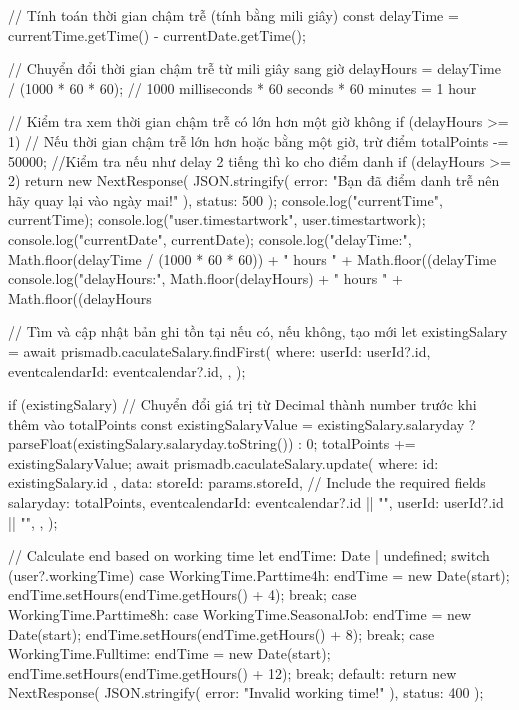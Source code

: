 {{{      // Tính toán thời gian chậm trễ (tính bằng mili giây)
      const delayTime = currentTime.getTime() - currentDate.getTime();

      // Chuyển đổi thời gian chậm trễ từ mili giây sang giờ
       delayHours = delayTime / (1000 * 60 * 60); // 1000 milliseconds * 60 seconds * 60 minutes = 1 hour

      // Kiểm tra xem thời gian chậm trễ có lớn hơn một giờ không
      if (delayHours >= 1) {
        // Nếu thời gian chậm trễ lớn hơn hoặc bằng một giờ, trừ điểm
        totalPoints -= 50000;
      }
      //Kiểm tra nếu như delay  2 tiếng thì ko cho điểm danh
      if (delayHours >= 2) {
        return new NextResponse(
          JSON.stringify({ error: "Bạn đã điểm danh trễ nên hãy quay lại vào ngày mai!" }),
          { status: 500 }
        );
      }
      console.log("currentTime", currentTime);
      console.log("user.timestartwork", user.timestartwork);
      console.log("currentDate", currentDate);
      console.log("delayTime:", Math.floor(delayTime / (1000 * 60 * 60)) + " hours " + Math.floor((delayTime %
      console.log("delayHours:", Math.floor(delayHours) + " hours " + Math.floor((delayHours %
    }

    // Tìm và cập nhật bản ghi tồn tại nếu có, nếu không, tạo mới
    let existingSalary = await prismadb.caculateSalary.findFirst({
      where: {
        userId: userId?.id,
        eventcalendarId: eventcalendar?.id,
      },
    });

    if (existingSalary) {
      // Chuyển đổi giá trị từ Decimal thành number trước khi thêm vào totalPoints
      const existingSalaryValue = existingSalary.salaryday
        ? parseFloat(existingSalary.salaryday.toString())
        : 0;
      totalPoints += existingSalaryValue;
      await prismadb.caculateSalary.update({
        where: { id: existingSalary.id },
        data: {
          storeId: params.storeId, // Include the required fields
          salaryday: totalPoints,
          eventcalendarId: eventcalendar?.id || "",
          userId: userId?.id || "",
        },
      });
    }

    // Calculate end based on working time
    let endTime: Date | undefined;
    switch (user?.workingTime) {
      case WorkingTime.Parttime4h:
        endTime = new Date(start);
        endTime.setHours(endTime.getHours() + 4);
        break;
      case WorkingTime.Parttime8h:
      case WorkingTime.SeasonalJob:
        endTime = new Date(start);
        endTime.setHours(endTime.getHours() + 8);
        break;
      case WorkingTime.Fulltime:
        endTime = new Date(start);
        endTime.setHours(endTime.getHours() + 12);
        break;
      default:
        return new NextResponse(
          JSON.stringify({ error: "Invalid working time!" }),
          { status: 400 }
        );
    }

}}

